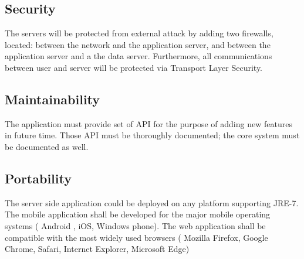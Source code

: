   \subsection{Security}
  The servers will be protected from external attack by adding two firewalls, located: between the network and the application server, 
  and between the application server and a the data server.
  Furthermore, all communications between user and server will be protected via Transport Layer Security.
  \subsection{Maintainability}
  The application must provide set of API for the purpose of adding new features in future time.
  Those API must be thoroughly documented; the core system must be documented as well.
  \subsection{Portability}
  The server side application could be deployed on any platform supporting JRE-7.\\
  The mobile application shall be developed for the major mobile operating systems ( Android , iOS, Windows phone).
  The web application shall be compatible with the most widely used browsers ( Mozilla Firefox, Google Chrome, Safari, Internet Explorer, Microsoft Edge) %
